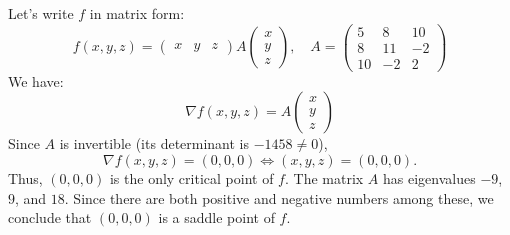 \documentclass[answers]{exam}
\begin{document}
\begin{questions}
\begin{parts}
        \begin{solution}
            Let's write $f$ in matrix form:
            \[
                f(x,y,z) = \begin{pmatrix}
                    x&y&z
                \end{pmatrix}A\begin{pmatrix}
                    x\\y\\z
                \end{pmatrix},\quad
                A = \begin{pmatrix}
                    5 & 8 & 10\\8&11&-2\\10&-2&2
                \end{pmatrix}
            \]
            We have:
            \[
                \nabla f(x,y,z) = A\begin{pmatrix}x\\y\\z
                \end{pmatrix}
            \]
            Since $A$ is invertible (its determinant is $-1458\neq 0$),
            \[
                \nabla f(x,y,z)=(0,0,0)
                \Longleftrightarrow
                (x,y,z)=(0,0,0).
            \]
            Thus, $(0,0,0)$ is the only critical point of $f$.
            The matrix $A$ has eigenvalues $-9$, $9$, and $18$.
            Since there are both positive and negative numbers among these,
            we conclude that $(0,0,0)$ is a saddle point of $f$.
        \end{solution}
    \end{parts}
\end{questions}
\end{document}
